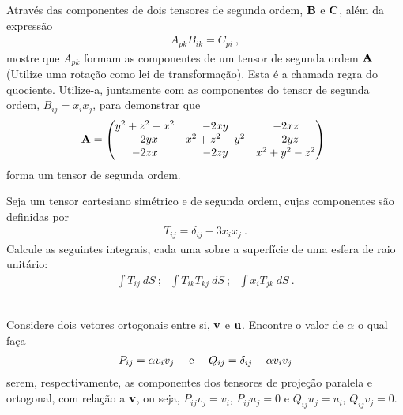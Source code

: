 \documentclass[a4paper,12pt]{article}
\begin{document}
\indent \par Através das componentes de dois tensores de segunda ordem, ${\bf{B}}$ e ${\bf{C}}$, além da expressão   
%
\begin{eqnarray}
  \nonumber
  A_{pk}B_{ik}=C_{pi} ~,
 \end{eqnarray}
%
\noindent mostre que $A_{pk}$ formam as componentes de um tensor de segunda ordem ${\bf{A}}$ (Utilize uma rotação como lei de transformação). Esta é a chamada regra do quociente. Utilize-a, juntamente com as componentes do tensor de segunda ordem, $B_{ij}=x_{i}x_{j}$, para demonstrar que
%
\begin{eqnarray}
  \nonumber
  {\bf{A}}= 
  \begin{pmatrix}
 y^2 + z^2 - x^2 & -2xy & -2xz \\
 -2yx & x^2 + z^2 - y^2 & -2yz \\
 -2zx & -2zy & x^2 + y^2 - z^2
\end{pmatrix}~
%
 \end{eqnarray}
%
\noindent forma um tensor de segunda ordem.\\
%



\indent \par Seja um tensor cartesiano simétrico e de segunda ordem, cujas componentes são definidas por
%
\begin{eqnarray}
  \nonumber
  T_{ij}=\delta_{ij} - 3x_{i}x_{j} ~.
 \end{eqnarray}
%
\noindent Calcule as seguintes integrais, cada uma sobre a superfície de uma esfera de raio unitário:
%
\begin{eqnarray}
  \nonumber
  \int T_{ij} ~dS~;~~~ \int T_{ik}T_{kj} ~dS ~;~~~ \int x_{i}T_{jk} ~dS ~.
 \end{eqnarray}\\
%


\indent \par Considere dois vetores ortogonais entre si, ${\bf{v}}$ e ${\bf{u}}$. Encontre o valor de $\alpha$ o qual faça 
%
\begin{eqnarray}
  \nonumber
  P_{ij} = \alpha v_{i}v_{j}~~~~\textnormal{e} ~~~~ Q_{ij}=\delta_{ij}-\alpha v_{i}v_{j}
 \end{eqnarray}
%
\noindent serem, respectivamente, as componentes dos tensores de projeção paralela e ortogonal, com relação a ${\bf{v}}$, ou seja, $P_{ij}v_{j}=v_{i}$, $P_{ij}u_{j}=0$ e $Q_{ij}u_{j}=u_{i}$, $Q_{ij}v_{j}=0$.\\
\end{document}

